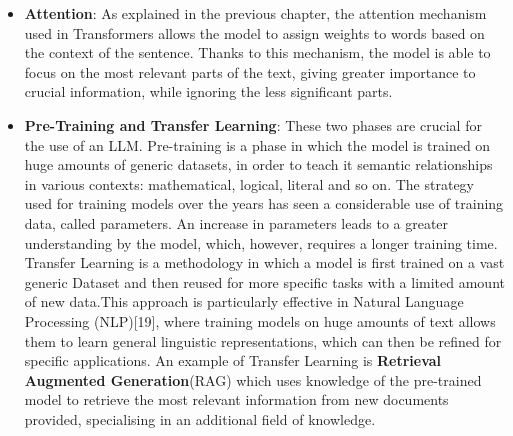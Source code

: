 \begin{itemize}
\item \textbf{Attention}: As explained in the previous chapter, the attention mechanism used in Transformers allows the model to assign weights to words based on the context of the sentence. Thanks to this mechanism, the model is able to focus on the most relevant parts of the text, giving greater importance to crucial information, while ignoring the less significant parts.
\item \textbf{Pre-Training and Transfer Learning}: These two phases are crucial for the use of an LLM. Pre-training is a phase in which the model is trained on huge amounts of generic datasets, in order to teach it semantic relationships in various contexts: mathematical, logical, literal and so on. The strategy used for training models over the years has seen a considerable use of training data, called parameters. An increase in parameters leads to a greater understanding by the model, which, however, requires a longer training time. Transfer Learning is a methodology in which a model is first trained on a vast generic Dataset and then reused for more specific tasks with a limited amount of new data.This approach is particularly effective in Natural Language Processing (NLP)[19], where training models on huge amounts of text allows them to learn general linguistic representations, which can then be refined for specific applications. An example of Transfer Learning is \textbf{Retrieval Augmented Generation}(RAG)\cite{Rag} which uses knowledge of the pre-trained model to retrieve the most relevant information from new documents provided, specialising in an additional field of knowledge.

\end{itemize}

